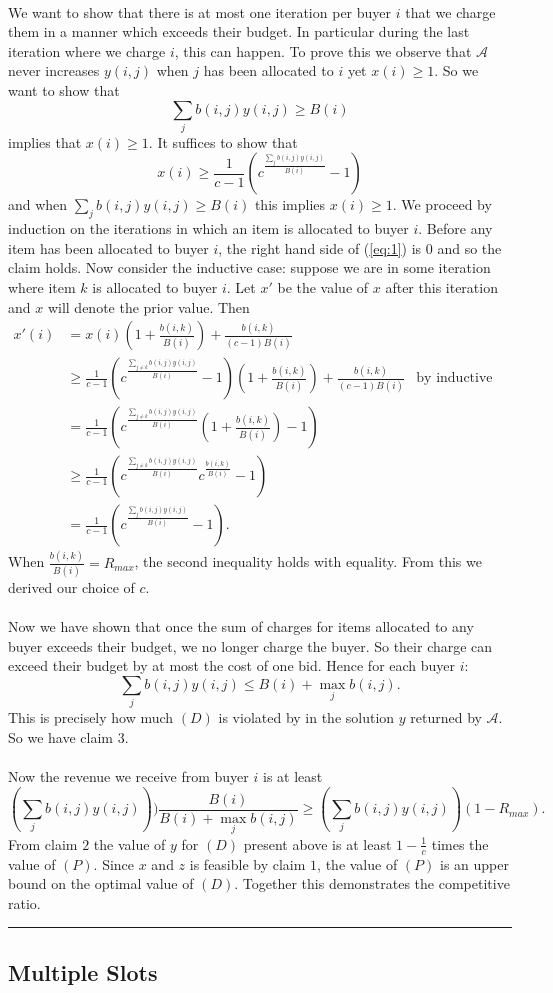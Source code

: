 \documentclass[letterpaper,12pt,oneside,onecolumn]{article}
\newcommand{\cA}{\mathcal{A}} \newcommand{\cB}{\mathcal{B}}
\newenvironment{proof}{{\bf Proof:  }}{\hfill\rule{2mm}{2mm}}
\begin{document}
\begin{proof}
\paragraph{}
We want to show that there is at most one iteration per buyer $i$ that we charge them in a manner which exceeds their budget. In particular during the last iteration where we charge $i$, this can happen. To prove this we observe that $\cA$ never increases $y(i,j)$ when $j$ has been allocated to $i$ yet $x(i) \geq 1$. So we want to show that 
$$\sum_j b(i,j)y(i,j) \geq B(i)$$
implies that $x(i) \geq 1$. It suffices to show that 
\begin{equation}\label{eq:1}
x(i) \geq \frac{1}{c-1}(c^{\frac{\sum_j b(i,j)y(i,j)}{B(i)}} -1)
\end{equation}
and when $\sum_j b(i,j)y(i,j) \geq B(i)$ this implies $x(i) \geq 1$. We proceed by induction on the iterations in which an item is allocated to buyer $i$. Before any item has been allocated to buyer $i$, the right hand side of (\ref{eq:1}) is $0$ and so the claim holds. Now consider the inductive case: suppose we are in some iteration where item $k$ is allocated to buyer $i$. Let $x'$ be the value of $x$ after this iteration and $x$ will denote the prior value. Then
\begin{align*}
x'(i) &= x(i)(1+\frac{b(i,k)}{B(i)}) + \frac{b(i,k)}{(c-1)B(i)} \\
&\geq \frac{1}{c-1}(c^{\frac{\sum_{j\neq k} b(i,j)y(i,j)}{B(i)}} -1)(1+\frac{b(i,k)}{B(i)}) + \frac{b(i,k)}{(c-1)B(i)}  &\text{by inductive hypothesis}\\
&= \frac{1}{c-1}(c^{\frac{\sum_{j\neq k} b(i,j)y(i,j)}{B(i)}}(1+\frac{b(i,k)}{B(i)}) - 1) \\
&\geq \frac{1}{c-1}(c^{\frac{\sum_{j\neq k} b(i,j)y(i,j)}{B(i)}}c^{\frac{b(i,k)}{B(i)}} -1) \\
&=\frac{1}{c-1}(c^{\frac{\sum_{j} b(i,j)y(i,j)}{B(i)}} -1).
\end{align*}
When $\frac{b(i,k)}{B(i)} = R_{max}$, the second inequality holds with equality. From this we derived our choice of $c$.
\paragraph{}
Now we have shown that once the sum of charges for items allocated to any buyer exceeds their budget, we no longer charge the buyer. So their charge can exceed their budget by at most the cost of one bid. Hence for each buyer $i$:
$$\sum_j b(i,j)y(i,j) \leq B(i) + \max_j b(i,j).$$
This is precisely how much $(D)$ is violated by in the solution $y$ returned by $\cA$. So we have claim $3$.
\paragraph{}
Now the revenue we receive from buyer $i$ is at least
$$(\sum_j b(i,j)y(i,j))) \frac{B(i)}{B(i) + \max_j b(i,j)} \geq (\sum_j b(i,j)y(i,j)) (1-R_{max}).$$
From claim $2$ the value of $y$ for $(D)$ present above is at least $1-\frac{1}{c}$ times the value of $(P)$. Since $x$ and $z$ is feasible by claim $1$, the value of $(P)$ is an upper bound on the optimal value of $(D)$. Together this demonstrates the competitive ratio.
\end{proof}
\subsection{Multiple Slots}


\end{document}
